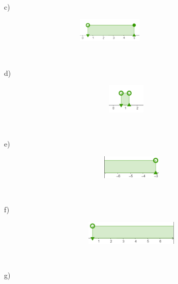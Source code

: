 \begin{respostas}{5}
~~

 c)

\begin{figure}[H]
	\begin{Center}
		\includegraphics[width=3.49in,height=0.46in]{capitulos/conjuntos_numericos/media/image19.png}
	\end{Center}
\end{figure}

~~

d)

\begin{figure}[H]
	\begin{Center}
		\includegraphics[width=4.17in,height=0.56in]{capitulos/conjuntos_numericos/media/image20.png}
	\end{Center}
\end{figure}

~~

 e)

\begin{figure}[H]
	\begin{Center}
		\includegraphics[width=4.38in,height=0.45in]{capitulos/conjuntos_numericos/media/image21.png}
	\end{Center}
\end{figure}

~~

 f)

\begin{figure}[H]
	\begin{Center}
		\includegraphics[width=4.38in,height=0.45in]{capitulos/conjuntos_numericos/media/image22.png}
	\end{Center}
\end{figure}

~~

 g)


\end{respostas}
